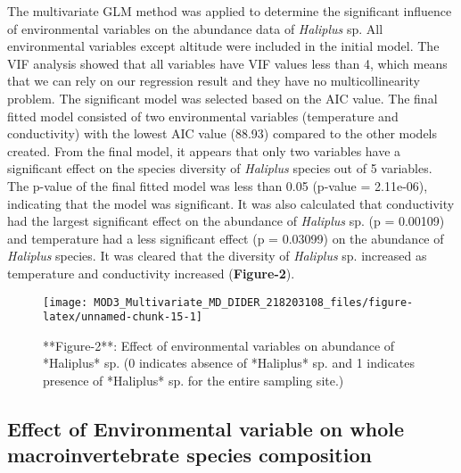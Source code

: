 \documentclass[
]{article}
\begin{document}
The multivariate GLM method was applied to determine the significant
influence of environmental variables on the abundance data of
\emph{Haliplus} sp. All environmental variables except altitude were
included in the initial model. The VIF analysis showed that all
variables have VIF values less than 4, which means that we can rely on
our regression result and they have no multicollinearity problem. The
significant model was selected based on the AIC value. The final fitted
model consisted of two environmental variables (temperature and
conductivity) with the lowest AIC value (88.93) compared to the other
models created. From the final model, it appears that only two variables
have a significant effect on the species diversity of \emph{Haliplus}
species out of 5 variables. The p-value of the final fitted model was
less than 0.05 (p-value = 2.11e-06), indicating that the model was
significant. It was also calculated that conductivity had the largest
significant effect on the abundance of \emph{Haliplus} sp. (p = 0.00109)
and temperature had a less significant effect (p = 0.03099) on the
abundance of \emph{Haliplus} species. It was cleared that the diversity
of \emph{Haliplus} sp. increased as temperature and conductivity
increased (\textbf{Figure-2}).

\begin{figure}

{\centering \texttt{[image: MOD3\_Multivariate\_MD\_DIDER\_218203108\_files/figure-latex/unnamed-chunk-15-1]} 

}

\caption{**Figure-2**: Effect of environmental variables on abundance of *Haliplus* sp. (0 indicates absence of *Haliplus* sp. and 1 indicates presence of *Haliplus* sp. for the entire sampling site.)}\label{fig:unnamed-chunk-15}
\end{figure}

\hypertarget{effect-of-environmental-variable-on-whole-macroinvertebrate-species-composition}{%
\subsection{Effect of Environmental variable on whole macroinvertebrate
species
composition}\label{effect-of-environmental-variable-on-whole-macroinvertebrate-species-composition}}
\end{document}
